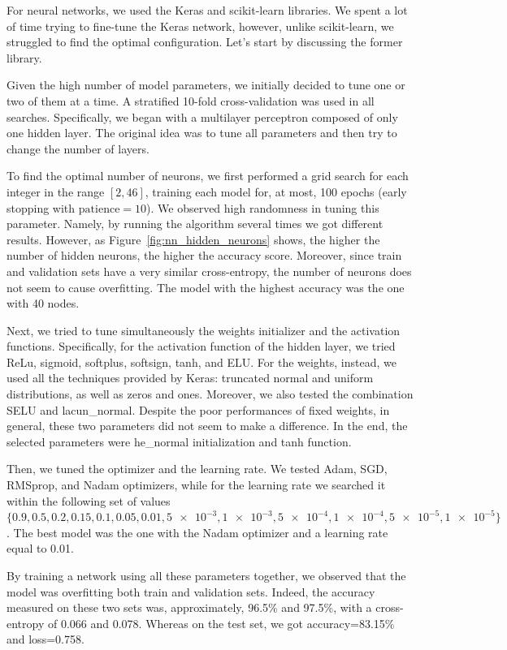 \documentclass[10pt, a4paper, twocolumn]{article}
\begin{document}
For neural networks, we used the Keras and scikit-learn libraries. We spent a lot of time trying to fine-tune the Keras network, however, unlike scikit-learn, we struggled to find the optimal configuration. Let's start by discussing the former library.

Given the high number of model parameters, we initially decided to tune one or two of them at a time. A stratified 10-fold cross-validation was used in all searches. Specifically, we began with a multilayer perceptron composed of only one hidden layer. The original idea was to tune all parameters and then try to change the number of layers. 

To find the optimal number of neurons, we first performed a grid search for each integer in the range $[2, 46]$, training each model for, at most, 100 epochs (early stopping with $\mathrm{patience}=10$). We observed high randomness in tuning this parameter. Namely, by running the algorithm several times we got different results. However, as Figure~\ref{fig:nn_hidden_neurons} shows, the higher the number of hidden neurons, the higher the accuracy score. Moreover, since train and validation sets have a very similar cross-entropy, the number of neurons does not seem to cause overfitting. The model with the highest accuracy was the one with 40 nodes.

Next, we tried to tune simultaneously the weights initializer and the activation functions. Specifically, for the activation function of the hidden layer, we tried ReLu, sigmoid, softplus, softsign, tanh, and ELU. For the weights, instead, we used all the techniques provided by Keras: truncated normal and uniform distributions, as well as zeros and ones. Moreover, we also tested the combination SELU and lacun\_normal. Despite the poor performances of fixed weights, in general, these two parameters did not seem to make a difference. In the end, the selected parameters were he\_normal initialization and tanh function.

Then, we tuned the optimizer and the learning rate. We tested Adam, SGD, RMSprop, and Nadam optimizers, while for the learning rate we searched it within the following set of values $\{0.9, 0.5, 0.2, 0.15, 0.1, 0.05, 0.01, \num{5e-3}, \num{1e-3}, \num{5e-4}, \num{1e-4},\num{5e-5}, \num{1e-5}\}$. The best model was the one with the Nadam optimizer and a learning rate equal to 0.01. 

By training a network using all these parameters together, we observed that the model was overfitting both train and validation sets. Indeed, the accuracy measured on these two sets was, approximately, 96.5\% and 97.5\%, with a cross-entropy of 0.066 and 0.078. Whereas on the test set, we got accuracy=83.15\% and loss=0.758. 
\end{document}
